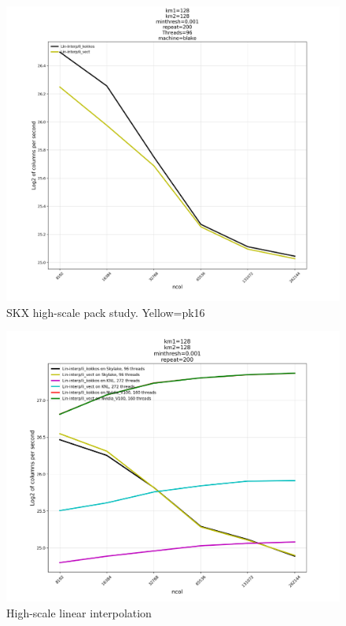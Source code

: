 \documentclass[10pt,twocolumn]{article}
\begin{document}
\onecolumn

\begin{figure}[hbt]
  \centering
  \includegraphics[width=1.0\linewidth]{blake-pk-li.pdf}
  \caption{SKX high-scale pack study. Yellow=pk16}
\end{figure}

\begin{figure}[hbt]
  \centering
  \includegraphics[width=1.0\linewidth]{high-scale-li.pdf}
  \caption{High-scale linear interpolation}
\end{figure}
\end{document}
